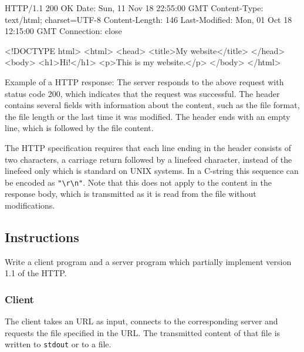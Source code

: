\begin{center}
\begin{minipage}{8cm}
\begin{osuefmtcode}
HTTP/1.1 200 OK
Date: Sun, 11 Nov 18 22:55:00 GMT
Content-Type: text/html; charset=UTF-8
Content-Length: 146
Last-Modified: Mon, 01 Oct 18 12:15:00 GMT
Connection: close

<!DOCTYPE html>
<html>
  <head>
    <title>My website</title>
  </head>
  <body>
    <h1>Hi!</h1>
    <p>This is my website.</p>
  </body>
</html>
\end{osuefmtcode}
\end{minipage}
\begin{minipage}{12cm}
\vspace{3mm}
\footnotesize{Example of a HTTP response:
The server responds to the above request with status code 200,
which indicates that the request was successful.
The header contains several fields with information about the content,
such as the file format, the file length or the last time it was modified.
The header ends with an empty line, which is followed by the file content.}
\end{minipage}
\end{center}

The HTTP specification requires
that each line ending in the header consists of two characters,
a carriage return followed by a linefeed character,
instead of the linefeed only which is standard on UNIX systems.
In a C-string this sequence can be encoded as \verb|"\r\n"|.
Note that this does not apply to the content in the response body,
which is transmitted as it is read from the file without modifications.

\subsection*{Instructions}

Write a client program and a server program
which partially implement version 1.1 of the HTTP.

\subsubsection*{Client}

The client takes an URL as input,
connects to the corresponding server
and requests the file specified in the URL.
The transmitted content of that file is written to \verb|stdout| or to a file.

